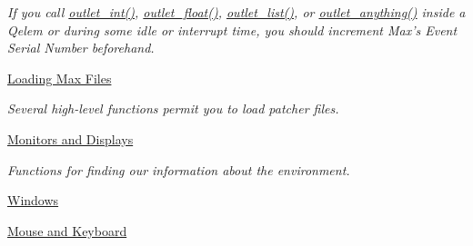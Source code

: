 \begin{DoxyCompactItemize}
\begin{DoxyCompactList}\small\item\em If you call \hyperlink{group__inout_ga0b2b38216f2f4dba486bfcd2273f255e}{outlet\_\-int()}, \hyperlink{group__inout_gafbb3f62a413f05a394391afde5b3c30f}{outlet\_\-float()}, \hyperlink{group__inout_gabdef4fbe6e1040dc28204b8070bdcda5}{outlet\_\-list()}, or \hyperlink{group__inout_ga12798ee897e01dac21ee547c4091d8a8}{outlet\_\-anything()} inside a Qelem or during some idle or interrupt time, you should increment Max’s Event Serial Number beforehand. \item\end{DoxyCompactList}\item 
\hyperlink{group__loading__max__files}{Loading Max Files}


\begin{DoxyCompactList}\small\item\em Several high-\/level functions permit you to load patcher files. \item\end{DoxyCompactList}\item 
\hyperlink{group__jmonitor}{Monitors and Displays}


\begin{DoxyCompactList}\small\item\em Functions for finding our information about the environment. \item\end{DoxyCompactList}\item 
\hyperlink{group__jwind}{Windows}
\item 
\hyperlink{group__jmouse}{Mouse and Keyboard}
\end{DoxyCompactItemize}
